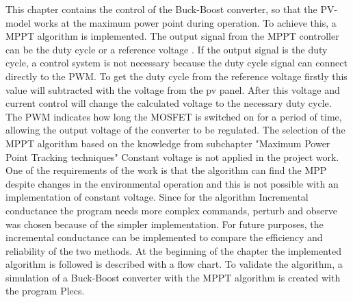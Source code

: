 This chapter contains the control of the Buck-Boost converter, so that the PV-model works at the maximum power point during operation. To achieve this, a MPPT algorithm is implemented. The output signal from the MPPT controller can be the duty cycle or a reference voltage . If the output signal is the duty cycle, a control system is not necessary because the duty cycle signal can connect directly to the PWM. To get the duty cycle from the reference voltage firstly this value will subtracted with the voltage from the pv panel. After this voltage and current control will change the calculated voltage to the necessary duty cycle. The PWM indicates how long the MOSFET is switched on for a period of time, allowing the output voltage of the converter to be regulated.
The selection of the MPPT algorithm based on the knowledge from subchapter "Maximum Power Point Tracking techniques"
Constant voltage is not applied in the project work. One of the requirements of the work is that the algorithm can find the MPP despite changes in the environmental operation and this is not possible with an implementation of constant voltage. Since for the algorithm Incremental conductance the program needs more complex commands, perturb and observe was chosen because of the simpler implementation. For future purposes, the incremental conductance can be implemented to compare the efficiency and reliability of the two methods.
At the beginning of the chapter the implemented algorithm is followed is described with a flow chart. To validate the algorithm, a simulation of a Buck-Boost converter with the MPPT algorithm is created with the program Plecs.
